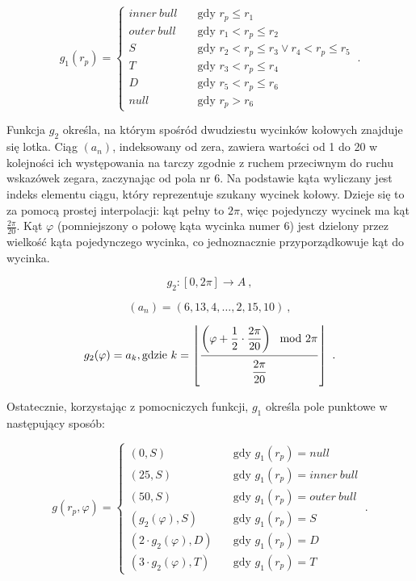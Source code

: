 \[
g_1(r_p) = 
     \begin{cases}
       inner\ bull &\quad\text{gdy } r_p \le r_1 \\
       outer\ bull &\quad\text{gdy } r_1 < r_p \le r_2 \\
       S &\quad\text{gdy } r_2 < r_p \le r_3 \lor r_4 < r_p \le r_5 \\
       T &\quad\text{gdy } r_3 < r_p \le r_4 \\
       D &\quad\text{gdy } r_5 < r_p \le r_6 \\
       null &\quad\text{gdy } r_p > r_6
     \end{cases}\ .
\]

Funkcja $g_2$ określa, na którym spośród dwudziestu wycinków kołowych znajduje się lotka. Ciąg $(a_n)$, indeksowany od zera, zawiera wartości od 1 do 20 w kolejności ich występowania na tarczy zgodnie z ruchem przeciwnym do ruchu wskazówek zegara, zaczynając od pola nr 6. Na podstawie kąta wyliczany jest indeks elementu ciągu, który reprezentuje szukany wycinek kołowy. Dzieje się to za pomocą prostej interpolacji: kąt pełny to $2\pi$, więc pojedynczy wycinek ma kąt $\frac{2\pi}{20}$. Kąt $\varphi$ (pomniejszony o połowę kąta wycinka numer 6) jest dzielony przez wielkość kąta pojedynczego wycinka, co jednoznacznie przyporządkowuje kąt do wycinka.

\[
g_2: [0, 2\pi] \to A\ ,
\]

\[
(a_n) = (6, 13, 4, \ldots, 2, 15, 10)\ ,
\]

\[
g_2(\varphi) = a_k, \mbox{gdzie } k = \left \lfloor{\myfrac[8pt]{\displaystyle \left(\varphi + \frac{1}{2} \cdot \frac{2\pi}{20}\right) \mod 2\pi}{\displaystyle \frac{2\pi}{20}}}\right \rfloor\ .
\]

Ostatecznie, korzystając z pomocniczych funkcji, $g_1$ określa pole punktowe w następujący sposób:

\[
g(r_p, \varphi) = 
     \begin{cases}
       (0, S) &\quad\text{gdy } g_1(r_p) = null \\
       (25, S) &\quad\text{gdy } g_1(r_p) = inner\ bull \\
       (50, S) &\quad\text{gdy } g_1(r_p) = outer\ bull \\
       (g_2(\varphi), S) &\quad\text{gdy } g_1(r_p) = S \\
       (2 \cdot g_2(\varphi), D) &\quad\text{gdy } g_1(r_p) = D \\
       (3 \cdot g_2(\varphi), T) &\quad\text{gdy } g_1(r_p) = T
     \end{cases}\ .
\]
\begin{figure}[h!]
\begin{center}

\end{center}
\label{tarcza_promienie}
\end{figure} 